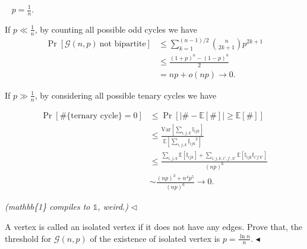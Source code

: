 ﻿\documentclass[11pt]{article}
\newenvironment{problem}[2][Problem]{\begin{trivlist}
\item[\hskip \labelsep {\bfseries #1}\hskip \labelsep {\bfseries #2.}]}{\hfill$\blacktriangleleft$\end{trivlist}}
\newenvironment{answer}[1][Answer]{\begin{trivlist}
\item[\hskip \labelsep {\bfseries #1.}\hskip \labelsep]}{\hfill$\lhd$\end{trivlist}}
\begin{document}
\begin{answer} ~
    $p=\frac{1}{n}$.

    If $p\ll \frac{1}{n}$, by counting all possible odd cycles we have
    $$
        \begin{aligned}
            \Pr[\mathcal G(n,p)~\text{not bipartite}] &\le \sum_{k=1}^{(n-1)/2}\binom{n}{2k+1}p^{2k+1}\\
            &\le \frac{(1+p)^n-(1-p)^n}{2}\\
            &= np+o(np)\to 0.
        \end{aligned}
    $$

    If $p\gg \frac{1}{n}$, by considering all possible tenary cycles we have

    $$
        \begin{aligned}
            \Pr[\#\{\text{ternary cycle}\}=0] &\le \Pr[|\#-\mathbb{E}[\#]|\ge\mathbb{E}[\#]]\\
            &\le \frac{\mathrm{Var}\left[\sum_{i,j,k}\mathbb I_{ijk}\right]}{\mathbb{E}\left[{\sum_{i,j,k}\mathbb I_{ijk}}^2\right]}\\
            &\le \frac{\sum_{i,j,k}\mathbb{E}[\mathbb I_{ijk}]+\sum_{i,j,k,i',j',k'}\mathbb{E}[\mathbb I_{ijk}\mathbb I_{i'j'k'}]}{(np)^6}\\
            &\sim \frac{(np)^3+n^4p^5}{(np)^6}\to 0.
        \end{aligned}
    $$

    \textit{(mathbb\{1\} compiles to $\mathbb{1}$, weird.)}
\end{answer}


\begin{problem}{6 (20')}
A vertex is called an isolated vertex if it does not have any edges. Prove that, the threshold for $\mathcal{G}(n,p)$ of the existence of isolated vertex is $p=\frac{\ln n}{n}$.
\end{problem}
\end{document}
